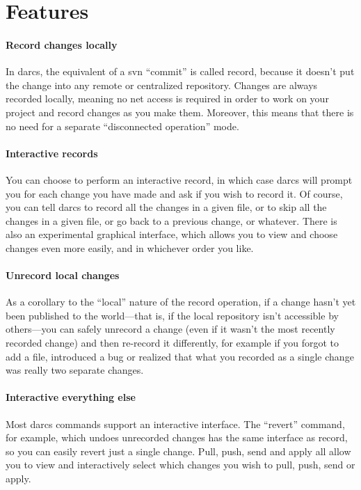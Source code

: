 \section{Features}

\paragraph{Record changes locally}
In darcs, the equivalent of a svn ``commit'' is called record, because it
doesn't put the change into any remote or centralized repository.  Changes
are always recorded locally, meaning no net access is required in order to
work on your project and record changes as you make them.  Moreover, this
means that there is no need for a separate ``disconnected operation'' mode.

\paragraph{Interactive records}
You can choose to perform an interactive record, in which case darcs will
prompt you for each change you have made and ask if you wish to record it.
Of course, you can tell darcs to record all the changes in a given file, or
to skip all the changes in a given file, or go back to a previous change,
or whatever.  There is also an experimental graphical interface, which
allows you to view and choose changes even more easily, and in whichever
order you like.

\paragraph{Unrecord local changes}
As a corollary to the ``local'' nature of the record operation, if a change
hasn't yet been published to the world---that is, if the local repository
isn't accessible by others---you can safely unrecord a change (even if it
wasn't the most recently recorded change) and then re-record it
differently, for example if you forgot to add a file, introduced a bug or
realized that what you recorded as a single change was really two separate
changes.

\paragraph{Interactive everything else}
Most darcs commands support an interactive interface.  The ``revert''
command, for example, which undoes unrecorded changes has the same
interface as record, so you can easily revert just a single change.  Pull,
push, send and apply all allow you to view and interactively select which
changes you wish to pull, push, send or apply.

